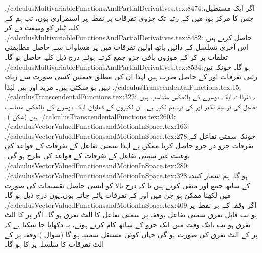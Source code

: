 ./calculusMultivariableFunctionsAndPartialDerivatives.tex:8474:اگر ایک مستطیل، جس کا مرکز  ہو، میں    کے  رتبہ تک جزوی تفرقات ہر نقطہ پر  استمراری ہوں، تب ہم  کے  کلیہ ٹیلر کو وسعت  دے کر
./calculusMultivariableFunctionsAndPartialDerivatives.tex:8482:حاصل کرتے ہیں۔ اس آخری  تسلسل   کے  دائیں ہاتھ    اولین  تفرقات میں    پر  مساوات  سے حاصل مطابقتی  تعلقات  پر   کر کے موزوں باقی جزو جمع کرتے ہوئے درج ذیل کلیہ حاصل ہو گا۔
./calculusMultivariableFunctionsAndPartialDerivatives.tex:8534:ہو گا۔ چونکہ تین رتبی تفرقات  اور  کے حاصل ضرب ہیں لہٰذا   ان کی  مطلق قیمتیں کسی صورت  سے زیادہ نہیں ہو سکتی ہیں۔ مزید  اور  ہیں لہٰذا
./calculusTranscendentalFunctions.tex:15:
./calculusTranscendentalFunctions.tex:322:یہ تفرقات ایک دوسرے کے بالعکس متناسب ہیں۔ تفاعل  کی ترسیم لکیر  اور  کی ترسیم لکیر  ہے۔ ان لکیروں کے ڈھلوان ایک دوسرے کے بالعکس متناسب ہیں (شکل )۔
./calculusTranscendentalFunctions.tex:2603:\\
./calculusVectorValuedFunctionsandMotionInSpace.tex:163:
./calculusVectorValuedFunctionsandMotionInSpace.tex:278:چونکہ سمتی تفاعل کے تفرقات  جزو در جزو حاصل کرنا ممکن  ہے لہٰذا  سمتی تفاعل کے تفرقات کے قواعد کی نوعیت  غیر سمتی تفاعل کے تفرقات کے قواعد کی طرح ہو گی۔
./calculusVectorValuedFunctionsandMotionInSpace.tex:280:\\
./calculusVectorValuedFunctionsandMotionInSpace.tex:328:ہو گا۔ ہم  شمار کنندہ  کے ساتھ    جمع اور منفی کرتے ہیں تا کہ درج بالا   کو ایسی حاصل تقسیمات  کی صورت میں لکھنا ممکن ہو جن میں   اور  کے تفرقات    پائے جاتے ہوں۔یوں درج ذیل ہو گا۔
./calculusVectorValuedFunctionsandMotionInSpace.tex:409:اگر وقفہ کے ہر نقطہ  پر  ہو تب    قابل تفرق سمتی تفاعل ،وقفہ    پر  سمتی تفاعل  کا الٹ تفرق ہو گا۔ اگر  پر  کا الٹ تفرق  ہو تب ،ایک  وقت میں ایک جزو  کے ساتھ کام کرتے ہوئے،  یہ دکھایا جا سکتا ہے کہ  پر  کے الٹ تفرق  کی صورت  ہو گی جہاں  کوئی مستقل سمتیہ ہو گا (سوال )۔وقفہ  پر  کے الٹ تفرقات کا سلسلہ  پر  کا  ہو گا۔ 
